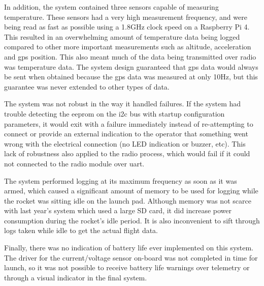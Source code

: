 In addition, the system contained three sensors capable of measuring temperature. These sensors had a very high
measurement frequency, and were being read as fast as possible using a 1.8GHz clock speed on a Raspberry Pi 4. This
resulted in an overwhelming amount of temperature data being logged compared to other more important measurements such
as altitude, acceleration and \gls{gps} position. This also meant much of the data being transmitted over radio was
temperature data. The system design guaranteed that \gls{gps} data would always be sent when obtained because the
\gls{gps} data was measured at only 10Hz, but this guarantee was never extended to other types of data.

The system was not robust in the way it handled failures. If the system had trouble detecting the \gls{eeprom} on the
\gls{i2c} bus with startup configuration parameters, it would exit with a failure immediately instead of re-attempting
to connect or provide an external indication to the operator that something went wrong with the electrical connection
(no LED indication or buzzer, etc). This lack of robustness also applied to the radio process, which would fail if it
could not connected to the radio module over \gls{uart}.

The system performed logging at its maximum frequency as soon as it was armed, which caused a significant amount of
memory to be used for logging while the rocket was sitting idle on the launch pad. Although memory was not scarce with
last year's system which used a large SD card, it did increase power consumption during the rocket's idle period. It is
also inconvenient to sift through logs taken while idle to get the actual flight data.

Finally, there was no indication of battery life ever implemented on this system. The driver for the current/voltage
sensor on-board was not completed in time for launch, so it was not possible to receive battery life warnings over
telemetry or through a visual indicator in the final system.
